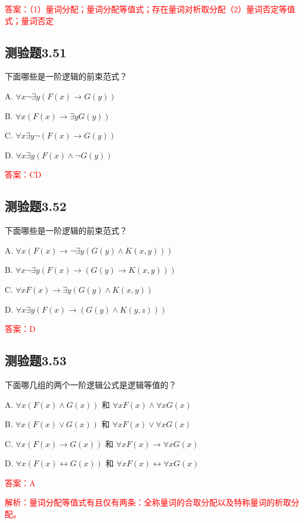 \documentclass[UTF8, heading=true]{ctexart}
\begin{document}
\textcolor{red}{答案：（1）量词分配；量词分配等值式；存在量词对析取分配（2）量词否定等值式；量词否定}



\subsection{测验题3.51}

下面哪些是一阶逻辑的前束范式？

A. $ \forall x \neg \exists y(F(x) \rightarrow G(y))$

B. $\forall x(F(x) \rightarrow \exists y G(y))$

C. $\forall x \exists y \neg(F(x) \rightarrow G(y))$

D. $\forall x \exists y(F(x) \wedge \neg G(y))$

\textcolor{red}{答案：CD}

\subsection{测验题3.52}

下面哪些是一阶逻辑的前束范式？

A. $\forall x(F(x) \rightarrow \neg \exists y(G(y) \wedge K(x, y)))$

B. $\forall x \neg \exists y(F(x) \rightarrow(G(y) \rightarrow K(x, y)))$

C. $\forall x F(x) \rightarrow \exists y(G(y) \wedge K(x, y))$

D. $\forall x \exists y(F(x) \rightarrow(G(y) \wedge K(y, z)))$

\textcolor{red}{答案：D}

\subsection{测验题3.53}

下面哪几组的两个一阶逻辑公式是逻辑等值的？

A. $\forall x(F(x) \wedge G(x))$ 和 $\forall x F(x) \wedge \forall x G(x)$

B. $\forall x(F(x) \vee G(x))$ 和 $\forall x F(x) \vee \forall x G(x)$

C. $\forall x(F(x) \rightarrow G(x))$ 和 $\forall x F(x) \rightarrow \forall x G(x)$

D. $\forall x(F(x) \leftrightarrow G(x))$ 和 $\forall x F(x) \leftrightarrow \forall x G(x)$

\textcolor{red}{答案：A}

\textcolor{red}{解析：量词分配等值式有且仅有两条：全称量词的合取分配以及特称量词的析取分配。}
\end{document}
